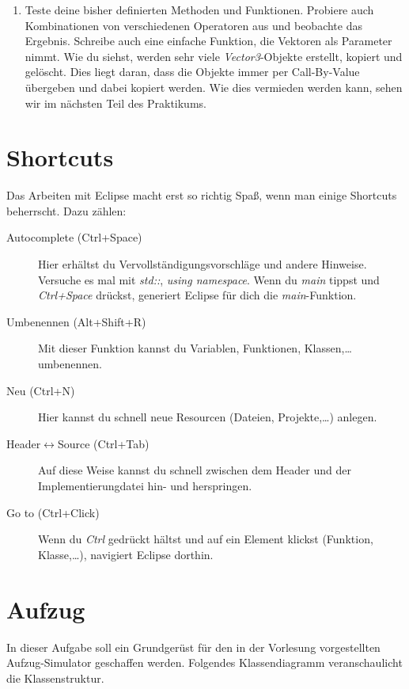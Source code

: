 \documentclass[
  accentcolor=tud1c,	%
  colorbacktitle,		%
  inverttitle,			%
  german,				%
  twoside
]{tudexercise}
\begin{document}
\begin{enumerate}
\item
Teste deine bisher definierten Methoden und Funktionen.
Probiere auch Kombinationen von verschiedenen Operatoren aus und beobachte das Ergebnis.
Schreibe auch eine einfache Funktion, die Vektoren als Parameter nimmt. 
Wie du siehst, werden sehr viele \emph{Vector3}-Objekte erstellt, kopiert und gelöscht.
Dies liegt daran, dass die Objekte immer per Call-By-Value übergeben und dabei kopiert werden.
Wie dies vermieden werden kann, sehen wir im nächsten Teil des Praktikums.

\end{enumerate}

\section{Shortcuts}

Das Arbeiten mit Eclipse macht erst so richtig Spaß, wenn man einige Shortcuts beherrscht.
Dazu zählen:
\begin{description}
\item[Autocomplete (Ctrl+Space)]
Hier erhältst du Vervollständigungsvorschläge und andere Hinweise.
Versuche es mal mit \emph{std::}, \emph{using namespace}.
Wenn du \emph{main} tippst und \emph{Ctrl+Space} drückst, generiert Eclipse für dich die \emph{main}-Funktion.

\item[Umbenennen (Alt+Shift+R)]
Mit dieser Funktion kannst du Variablen, Funktionen, Klassen,\dots umbenennen.

\item[Neu (Ctrl+N)]
Hier kannst du schnell neue Resourcen (Dateien, Projekte,\dots) anlegen.

\item[Header$\leftrightarrow$Source (Ctrl+Tab)]
Auf diese Weise kannst du schnell zwischen dem Header und der Implementierungdatei hin- und herspringen.

\item[Go to (Ctrl+Click)] Wenn du \emph{Ctrl} gedrückt hältst und auf ein Element klickst (Funktion, Klasse,\dots), navigiert Eclipse dorthin.

\end{description}


\section{Aufzug}
In dieser Aufgabe soll ein Grundgerüst für den in der Vorlesung vorgestellten Aufzug-Simulator geschaffen werden.
Folgendes Klassendiagramm veranschaulicht die Klassenstruktur.
\end{document}
